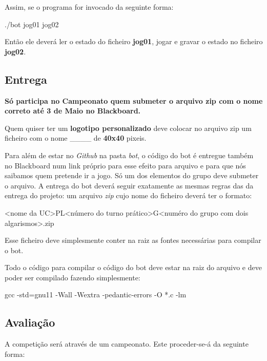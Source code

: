 Assim, se o programa for invocado da seguinte forma\+:


\begin{DoxyCode}
./bot jog01 jog02
\end{DoxyCode}


Então ele deverá ler o estado do ficheiro {\bfseries jog01}, jogar e gravar o estado no ficheiro {\bfseries jog02}.

\subsection*{Entrega}

{\bfseries Só participa no Campeonato quem submeter o arquivo zip com o nome correto até 3 de Maio no Blackboard.}

Quem quiser ter um {\bfseries logotipo personalizado} deve colocar no arquivo zip um ficheiro com o nome \+\_\+\+\_\+\_\+\+\_\+ de {\bfseries 40x40} pixeis.

Para além de estar no {\itshape Github} na pasta {\itshape bot}, o código do bot é entregue também no Blackboard num link próprio para esse efeito para arquivo e para que nós saibamos quem pretende ir a jogo. Só um dos elementos do grupo deve submeter o arquivo. A entrega do bot deverá seguir exatamente as mesmas regras das da entrega do projeto\+: um arquivo {\itshape zip} cujo nome do ficheiro deverá ter o formato\+: \begin{DoxyVerb}<nome da UC>PL<número do turno prático>G<numéro do grupo com dois algarismos>.zip
\end{DoxyVerb}


Esse ficheiro deve simplesmente conter na raiz as fontes necessárias para compilar o bot.

Todo o código para compilar o código do bot deve estar na raiz do arquivo e deve poder ser compilado fazendo simplesmente\+: \begin{DoxyVerb}gcc -std=gnu11 -Wall -Wextra -pedantic-errors -O *.c -lm
\end{DoxyVerb}


\subsection*{Avaliação}

A competição será através de um campeonato. Este proceder-\/se-\/á da seguinte forma\+:


